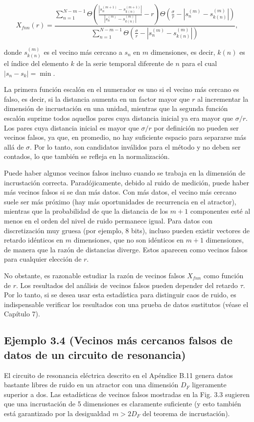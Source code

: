 \documentclass[10pt,a4paper]{book}
\begin{document}
\begin{equation}
X_{fnn}(r) = \frac{\sum_{n=1}^{N-m-1} \Theta \left( \frac{|s_{n}^{(m+1)} - s_{k(n)}^{(m+1)}|}{|s_{n}^{(m)} - s_{k(n)}^{(m)}|} - r \right) \Theta \left( \frac{\sigma}{r} - |s_{n}^{(m)} - s_{k(n)}^{(m)}| \right)}{\sum_{n=1}^{N-m-1} \Theta \left( \frac{\sigma}{r} - |s_{n}^{(m)} - s_{k(n)}^{(m)}| \right)},
\end{equation}

donde $s_{k(n)}^{(m)}$ es el vecino más cercano a $s_n$ en $m$ dimensiones, es decir, $k(n)$ es el índice del elemento $k$ de la serie temporal diferente de $n$ para el cual $|s_n - s_k| = \min$. 

La primera función escalón en el numerador es uno si el vecino más cercano es falso, es decir, si la distancia aumenta en un factor mayor que $r$ al incrementar la dimensión de incrustación en una unidad, mientras que la segunda función escalón suprime todos aquellos pares cuya distancia inicial ya era mayor que $\sigma/r$. Los pares cuya distancia inicial es mayor que $\sigma/r$ por definición no pueden ser vecinos falsos, ya que, en promedio, no hay suficiente espacio para separarse más allá de $\sigma$. Por lo tanto, son candidatos inválidos para el método y no deben ser contados, lo que también se refleja en la normalización.  

Puede haber algunos vecinos falsos incluso cuando se trabaja en la dimensión de incrustación correcta. Paradójicamente, debido al ruido de medición, puede haber más vecinos falsos si se dan más datos. Con más datos, el vecino más cercano suele ser más próximo (hay más oportunidades de recurrencia en el atractor), mientras que la probabilidad de que la distancia de los $m+1$ componentes esté al menos en el orden del nivel de ruido permanece igual. Para datos con discretización muy gruesa (por ejemplo, 8 bits), incluso pueden existir vectores de retardo idénticos en $m$ dimensiones, que no son idénticos en $m+1$ dimensiones, de manera que la razón de distancias diverge. Estos aparecen como vecinos falsos para cualquier elección de $r$.  

No obstante, es razonable estudiar la razón de vecinos falsos $X_{fnn}$ como función de $r$. Los resultados del análisis de vecinos falsos pueden depender del retardo $\tau$. Por lo tanto, si se desea usar esta estadística para distinguir caos de ruido, es indispensable verificar los resultados con una prueba de datos sustitutos (véase el Capítulo 7).

\subsection*{Ejemplo 3.4 (Vecinos más cercanos falsos de datos de un circuito de resonancia)}
El circuito de resonancia eléctrica descrito en el Apéndice B.11 genera datos bastante libres de ruido en un atractor con una dimensión $D_F$ ligeramente superior a dos.  
Las estadísticas de vecinos falsos mostradas en la Fig. 3.3 sugieren que una incrustación de 5 dimensiones es claramente suficiente (y esto también está garantizado por la desigualdad $m > 2D_F$ del teorema de incrustación).  
\end{document}
